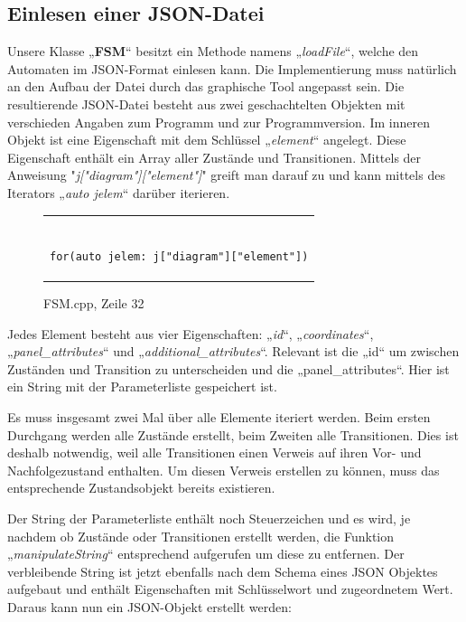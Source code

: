 \subsection{Einlesen einer JSON-Datei}
Unsere Klasse „\textbf{FSM}“ besitzt ein Methode namens „\textit{loadFile}“, welche den Automaten
im JSON-Format einlesen kann. Die Implementierung muss natürlich an den Aufbau
der Datei durch das graphische Tool angepasst sein. Die resultierende
JSON-Datei besteht aus zwei geschachtelten Objekten mit verschieden Angaben zum
Programm und zur Programmversion. Im inneren Objekt ist eine Eigenschaft mit dem
Schlüssel „\textit{element}“ angelegt. Diese Eigenschaft enthält ein Array aller Zustände
und Transitionen.
Mittels der Anweisung "\textit{j["diagram"]["element"]}" greift man
darauf zu und kann mittels des Iterators „\textit{auto jelem}“ darüber iterieren.

\begin{figure}[thp]
\begin{tabular}{c}
\begin{lstlisting}[style=json]

for(auto jelem: j["diagram"]["element"])

\end{lstlisting}
\end{tabular}
\centering
\caption{FSM.cpp, Zeile 32}
\end{figure}

Jedes Element besteht aus vier Eigenschaften: „\textit{id}“, „\textit{coordinates}“,
„\textit{panel\_attributes}“ und „\textit{additional\_attributes}“. Relevant ist die „id“ um
zwischen Zuständen und Transition zu unterscheiden und die „panel\_attributes“.
Hier ist ein String mit der Parameterliste gespeichert ist.

Es muss insgesamt zwei Mal über alle Elemente iteriert werden. Beim ersten
Durchgang werden alle Zustände erstellt, beim Zweiten alle Transitionen. Dies
ist deshalb notwendig, weil alle Transitionen einen Verweis auf ihren Vor- und
Nachfolgezustand enthalten. Um diesen Verweis erstellen zu können, muss das
entsprechende Zustandsobjekt bereits existieren.

Der String der Parameterliste enthält noch Steuerzeichen und es wird, je
nachdem ob Zustände oder Transitionen erstellt werden, die Funktion
„\textit{manipulateString}“ entsprechend aufgerufen um diese zu entfernen. Der
verbleibende String ist jetzt ebenfalls nach dem Schema eines JSON Objektes
aufgebaut und enthält Eigenschaften mit Schlüsselwort und zugeordnetem Wert.
Daraus kann nun ein JSON-Objekt erstellt werden:

